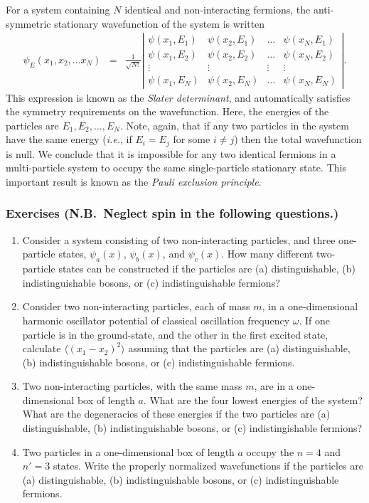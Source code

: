 For a system containing $N$ identical and non-interacting fermions,
the anti-symmetric stationary wavefunction of the system
is written
\begin{eqnarray}
\psi_{E}(x_1,x_2,\ldots x_N)& =&\frac{1}{\sqrt{N!}} \left|
\begin{array}{cccc}
\psi(x_1,E_1)&\psi(x_2,E_1)&\ldots&\psi(x_N,E_1)\\[0.5ex]
\psi(x_1,E_2)&\psi(x_2,E_2)&\ldots&\psi(x_N,E_2)\\[0.5ex]
\vdots&\vdots&\vdots&\vdots\\[0.5ex]
\psi(x_1,E_N)&\psi(x_2,E_N)&\ldots&\psi(x_N,E_N)
\end{array}\right|.
\end{eqnarray}
This expression is known as the {\em Slater determinant}, and automatically
satisfies the symmetry requirements on the wavefunction.
Here, the energies of the particles are $E_1, E_2, \ldots, E_N$.
Note, again, that if any two particles in the system have the same energy
({\em i.e.}, if $E_i=E_j$ for some $i\neq j$)
then the total wavefunction is null. We conclude that it is impossible
for any two identical fermions in a multi-particle system to
occupy the same single-particle stationary state. This important result is known as
the {\em Pauli exclusion principle}. 

\subsubsection*{Exercises {\rm (N.B.\ Neglect spin in the following questions.)}}
{\small
\begin{enumerate}
\item Consider a system consisting of two non-interacting particles, and three
one-particle states, $\psi_a(x)$, $\psi_b(x)$, and $\psi_c(x)$. How
many different two-particle states can be constructed if the particles are
(a) distinguishable, (b) indistinguishable bosons, or (c) indistinguishable
fermions? 

\item Consider two non-interacting particles, each of mass $m$, in 
a one-dimensional harmonic oscillator potential of classical oscillation
frequency $\omega$. If one particle is in the ground-state, and the
other in the first excited state, calculate $\langle (x_1-x_2)^2\rangle$
assuming that the particles are (a) distinguishable, (b) indistinguishable bosons, or (c) indistinguishable fermions.

\item Two non-interacting particles, with the same mass $m$, are
in a one-dimensional box of length $a$. What are the four lowest
energies of the system? What are the degeneracies of these
energies if the two particles are (a) distinguishable, (b) indistinguishable
bosons, or (c) indistingishable fermions? 

\item Two particles in a one-dimensional box of length $a$ occupy
the $n=4$ and $n'=3$ states. Write the properly normalized
wavefunctions if the particles are (a) distinguishable, (b) indistinguishable
bosons, or (c) indistinguishable fermions.

\end{enumerate}
}